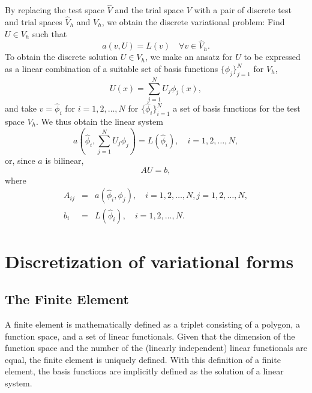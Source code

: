 By replacing the test space $\hat{V}$ and the trial space $V$ with a
pair of discrete test and trial spaces $\hat{V}_h$ and $V_h$, we
obtain the discrete variational problem: Find $U \in V_h$ such that
\begin{equation}
  a(v, U) = L(v) \quad \forall v \in \hat{V}_h.
\end{equation}
To obtain the discrete solution $U \in V_h$, we make an ansatz
 for $U$ to be expressed as a linear combination of a
suitable set of basis functions $\{\phi_j\}_{j=1}^N$ for $V_h$,
\begin{equation}
  U(x) = \sum_{j=1}^N U_j \phi_j(x),
\end{equation}
and take $v = \hat \phi_i$ for $i = 1,2,\ldots,N$ for
$\{\hat{\phi}_i\}_{i=1}^N$ a set of basis functions for the test space
$V_h$. We thus obtain the linear system
\begin{equation}
  a(\hat{\phi}_i, \sum_{j=1}^N U_j \phi_j) = L(\hat{\phi}_i), \quad i = 1,2,\ldots,N,
\end{equation}
or, since $a$ is bilinear,
\begin{equation}
  A U = b,
\end{equation}
where
\begin{eqnarray}
  A_{ij} &=& a(\hat{\phi}_i, \phi_j), \quad i = 1,2,\ldots,N, j = 1,2,\ldots,N, \\
  b_i &=& L(\hat{\phi}_i), \quad i = 1,2,\ldots,N.
\end{eqnarray}

\section{Discretization of variational forms}

\subsection{The Finite Element}

A finite element is mathematically defined as a triplet consisting
of a polygon, a function space, and a set of linear functionals. 
Given that the dimension of the function space and the number of
the (linearly independent) linear functionals are equal, the
finite element is uniquely defined. 
With this definition of a finite element, the basis functions
are implicitly defined as the solution of a linear system.

